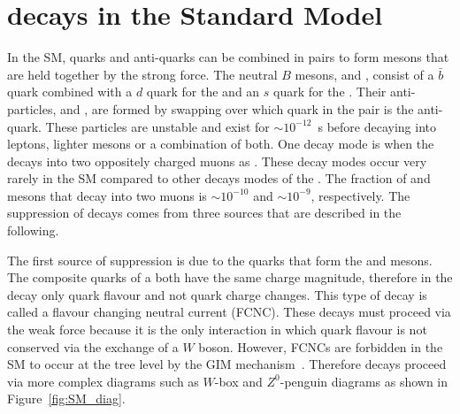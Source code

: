 \section[$B^0_{(s)}\to \mu^+ \mu^-$ decays in the Standard Model]{ decays in the Standard Model}
\label{sec:bsmumu_in_SM}
In the SM, quarks and anti-quarks can be combined in pairs to form mesons that are held together by the strong force. The neutral $B$ mesons, \bd and \bs, consist of a $\bar{b}$ quark combined with a $d$ quark for the \bd and an $s$ quark for the \bs. Their anti-particles, \barbd and \barbs, are formed by swapping over which quark in the pair is the anti-quark. These particles are unstable and exist for $\sim10^{-12}$~s before decaying into leptons, lighter mesons or a combination of both. One decay mode is when the \bsd decays into two oppositely charged muons as \bmumu. %
These decay modes occur very rarely in the SM compared to other decays modes of the \bsd. The fraction of \bd and \bs mesons that decay into two muons is $\sim10^{-10}$ and $\sim10^{-9}$, respectively. The suppression of \bmumu decays comes from three sources that are described in the following.


The first source of suppression is due to the quarks that form the \bd and \bs mesons. The composite quarks of a \bsd both have the same charge magnitude, therefore in the decay \bmumu only quark flavour and not quark charge changes. This type of decay is called a flavour changing neutral current (FCNC). These decays must proceed via the weak force because it is the only interaction in which quark flavour is not conserved via the exchange of a $W$ boson. However, FCNCs are forbidden in the SM to occur at the tree level by the GIM mechanism~\cite{PhysRevD.2.1285}. Therefore \bmumu decays proceed via more complex diagrams such as $W$-box and $Z^0$-penguin diagrams as shown in Figure~\ref{fig:SM_diag}.


